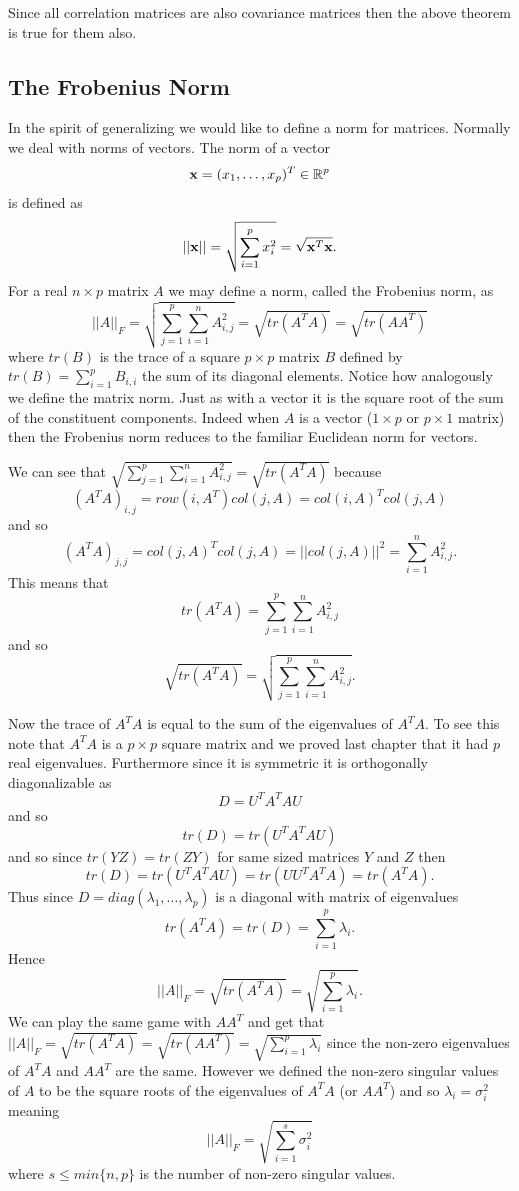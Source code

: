 \documentclass{book}
\begin{document}
Since all correlation matrices are also covariance matrices then the above theorem is true for them also. 

\subsection{The Frobenius Norm}

In the spirit of generalizing we would like to define a norm for matrices. Normally we deal with norms of vectors. The norm of a vector
$$
{\bf x}=(x_1,\ldots,x_p)^T\in\mathbb{R}^p
$$ 
is defined as 
$$
||{\bf x}||=\sqrt{\sum_{i=1}^{p}x_i^2}=\sqrt{{\bf x}^T{\bf x}}.
$$
For a real $n \times p$ matrix $A$ we may define a norm, called the Frobenius norm, as 
$$
||A||_F=\sqrt{\sum_{j=1}^{p}\sum_{i=1}^{n}A_{i,j}^2}=\sqrt{tr(A^TA)}=\sqrt{tr(AA^T)}
$$
where $tr(B)$ is the trace of a square $p \times p$ matrix $B$ defined by $tr(B)=\sum_{i=1}^{p}B_{i,i}$ the sum of its diagonal elements. Notice how analogously we define the matrix norm. Just as with a vector it is the square root of the sum of the constituent components. Indeed when $A$ is a vector ($1 \times p$ or $p \times 1$ matrix) then the Frobenius norm reduces to the familiar Euclidean norm for vectors. 

We can see that $\sqrt{\sum_{j=1}^{p}\sum_{i=1}^{n}A_{i,j}^2}=\sqrt{tr(A^TA)}$ because
$$
(A^TA)_{i,j}=row(i,A^T)col(j,A)=col(i,A)^Tcol(j,A)
$$
and so 
$$
(A^TA)_{j,j}=col(j,A)^Tcol(j,A)=||col(j,A)||^2=\sum_{i=1}^{n}A_{i,j}^2.
$$
This means that
$$
tr(A^TA)=\sum_{j=1}^{p}\sum_{i=1}^{n}A_{i,j}^2
$$
and so 
$$
\sqrt{tr(A^TA)}=\sqrt{\sum_{j=1}^{p}\sum_{i=1}^{n}A_{i,j}^2}.
$$

Now the trace of $A^TA$ is equal to the sum of the eigenvalues of $A^TA$. To see this note that $A^TA$ is a $p \times p$ square matrix and we proved last chapter that it had $p$ real eigenvalues. Furthermore since it is symmetric it is orthogonally diagonalizable as
$$
D=U^TA^TAU
$$
and so
$$
tr(D)=tr(U^TA^TAU)
$$
and so since $tr(YZ)=tr(ZY)$ for same sized matrices $Y$ and $Z$ then
$$
tr(D)=tr(U^TA^TAU)=tr(UU^TA^TA)=tr(A^TA).
$$
Thus since $D=diag(\lambda_1,\ldots,\lambda_p)$ is a diagonal with matrix of eigenvalues
$$
tr(A^TA)=tr(D)=\sum_{i=1}^{p}\lambda_i.
$$
Hence
$$
||A||_F=\sqrt{tr(A^TA)}=\sqrt{\sum_{i=1}^{p}\lambda_i}.
$$
We can play the same game with $AA^T$ and get that $||A||_F=\sqrt{tr(A^TA)}=\sqrt{tr(AA^T)}=\sqrt{\sum_{i=1}^{p}\lambda_i}$ since the non-zero eigenvalues of $A^TA$ and $AA^T$ are the same. However we defined the non-zero singular values of $A$ to be the square roots of the eigenvalues of $A^TA$ (or $AA^T$) and so $\lambda_i=\sigma_i^2$ meaning
$$
||A||_F=\sqrt{\sum_{i=1}^{s}\sigma_i^2}
$$
where $s\leq min\{n,p\}$ is the number of non-zero singular values. 
\end{document}
